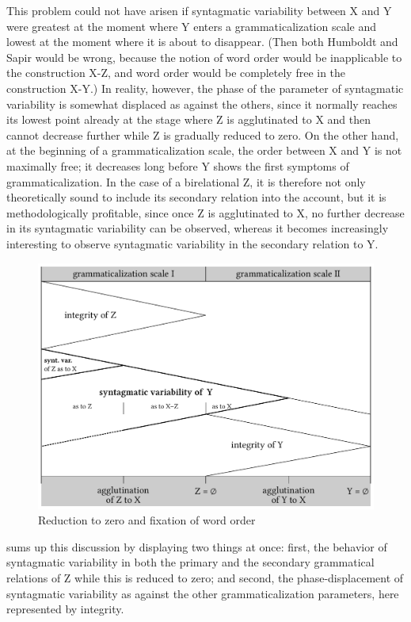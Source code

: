 This problem could not have arisen if syntagmatic variability between X and Y were greatest at the moment where Y enters a grammaticalization scale and lowest at the moment where it is about to disappear. (Then both Humboldt and Sapir would be wrong, because the notion of word order would be inapplicable to the construction X-Z, and word order would be completely free in the construction X-Y.) In reality, however, the phase of the parameter of syntagmatic variability is somewhat displaced as against the others, since it normally reaches its lowest point already at the stage where Z is agglutinated to X and then cannot decrease further while Z is gradually reduced to zero. On the other hand, at the beginning of a grammaticalization scale, the order between X and Y is not maximally free; it decreases long before Y shows the first symptoms of grammaticalization. In the case of a birelational Z, it is therefore not only theoretically sound to include its secondary relation into the account, but it is methodologically profitable, since once Z is agglutinated to X, no further decrease in its syntagmatic variability can be observed, whereas it becomes increasingly interesting to observe syntagmatic variability in the secondary relation to Y.

\begin{figure}
\includegraphics[width=\textwidth]{figures/12-reduction-to-zero.pdf}
	
\caption{Reduction to zero and fixation of word order}\label{F12}
\end{figure}
 sums up this discussion by displaying two things at once: first, the behavior of syntagmatic variability in both the primary and the secondary grammatical relations of Z while this is reduced to zero; and second, the phase-displacement of syntagmatic variability as against the other grammaticalization parameters, here represented by integrity.


